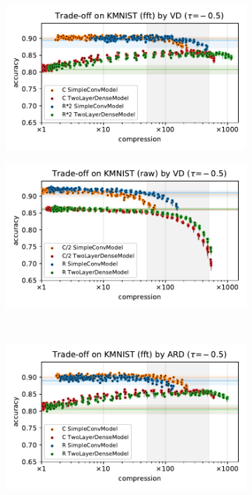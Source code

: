 \documentclass[a4paper,10pt,onecolumn]{article}
\begin{document}
\begin{figure}[b]
\begin{subfigure}[b]{0.5\columnwidth}
  \end{subfigure} \\ %
  \begin{subfigure}[b]{0.5\columnwidth}
    \centering
    \includegraphics[width=\columnwidth]{figure__mnist-like__trade-off/appendix__cmp__VD__kmnist__fft__-0.5.pdf}
  \end{subfigure}%
  \begin{subfigure}[b]{0.5\columnwidth}
    \centering
    \includegraphics[width=\columnwidth]{figure__mnist-like__trade-off/appendix__cmp__VD__kmnist__raw__-0.5.pdf}
  \end{subfigure} \\ %
  \begin{subfigure}[b]{0.5\columnwidth}
    \centering
    \includegraphics[width=\columnwidth]{figure__mnist-like__trade-off/appendix__ARD__kmnist__fft__-0.5.pdf}

\end{subfigure}
\end{figure}
\end{document}
